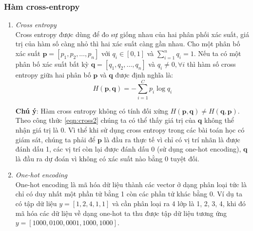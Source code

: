 \subsubsection{Hàm cross-entropy}
\begin{enumerate}
\item  \textit{Cross entropy}\\
Cross entropy được dùng để đo sự giống nhau của hai phân phối xác suất, giá trị của hàm số càng nhỏ thì hai xác suất càng gần nhau. Cho một phân bố xác suất $\textbf{p} = [p_1, p_2,\dots, p_n]$ với $q_i \in [0,1]$ và $\sum_{i=1}^{n} q_i = 1$. Nếu ta có một phân bố xác suất bất kỳ $\textbf{q} = [q_1, q_2, \dots, q_n]$ và $q_i \neq 0, \forall i$ thì hàm số cross entropy giữa hai phân bố $\textbf{p}$ và $\textbf{q}$ được định nghĩa là:
\begin{equation}
\label{eqn:cross2}
H(\textbf{p}, \textbf{q}) =-\sum_{i=1}^C p_i \log q_i 
\end{equation}\par

\textbf{Chú ý}: Hàm cross entropy không có tính đối xứng $H(\textbf{p}, \textbf{q}) \neq H(\textbf{q}, \textbf{p})$. Theo công thức \ref{eqn:cross2} chúng ta có thể thấy giá trị của $\textbf{q}$ không thể nhận giá trị là 0. Vì thể khi sử dụng cross entropy trong các bài toán học có giám sát, chúng ta phải để $\textbf{p}$ là đầu ra thực tế vì chỉ có vị trí nhãn là được đánh dấu 1, các vị trí còn lại được đánh dấu 0 (sử dụng one-hot encoding), $\textbf{q}$ là đầu ra dự đoán vì không có xác suất nào bằng 0 tuyệt đối.


\item \textit{One-hot encoding}\\
One-hot encoding là mã hóa dữ liệu thành các vector ở dạng phân loại tức là chỉ có duy nhất một phần tử bằng 1 còn các phần tử khác bằng 0. Ví dụ ta có tập dữ liệu $y=[1,2,4,1,1]$ và cần phân loại ra 4 lớp là 1, 2, 3, 4, khi đó mã hóa các dữ liệu về dạng one-hot ta thu được tập dữ liệu tương ứng $y=[1000,0100,0001,1000,1000]$.


\end{enumerate}
